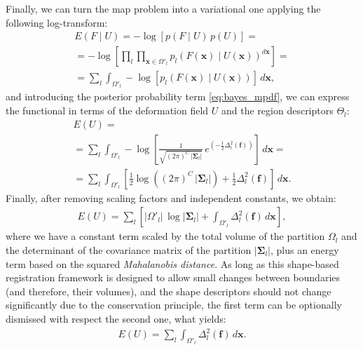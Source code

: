 Finally, we can turn the \gls{map} problem into a variational one
applying the following log-transform:
\begin{multline}
E(F \mid U)= -\log \left[ p(F \mid U) \, p(U) \right] = \\
= -\log \left[ \underset{l}{\prod} \underset{\mathbf{x}\in \Omega'_l}{\prod}
p_l( F(\mathbf{x}) \mid U(\mathbf{x}) )^{d\mathbf{x}} \right] = \\
= \sum\limits_l \int_{\Omega'_l} -\log \left[ p_l(F(\mathbf{x}) \mid U(\mathbf{x} ) ) \right] \, d\mathbf{x},
\label{eq:energy_1}
\end{multline}
and introducing the posterior probability term \eqref{eq:bayes_mpdf}, 
we can express the functional in terms of the deformation field $U$ and
the region descriptors $\Theta_l$:
\begin{multline}
E(U) = \\
= \sum\limits_l \int_{\Omega'_l} -\log \left[ \frac{1}{ \sqrt{(2\pi)^{C}\,\left|\boldsymbol{\Sigma}_{l}\right|}}\,{e^{\left(-\frac{1}{2}  \Delta^2_l (\mathbf{f}) \right)}} \right] \, d\mathbf{x} = \\
= \sum\limits_l \int_{\Omega'_l} \left[ \frac{1}{2} \log{ \left( (2\pi)^{C}\,\left|\boldsymbol{\Sigma}_{l}\right| \right)} + \frac{1}{2}  \Delta^2_l (\mathbf{f}) \right] \,d\mathbf{x}.
\end{multline}
Finally, after removing scaling factors and independent constants,
we obtain:
\begin{align}
E(U) = \sum\limits_l \left[ \left|\Omega'_l\right|\,\log \left|\mathbf{\Sigma}_l \right| + \int_{\Omega'_l} \Delta^2_l (\mathbf{f}) \,d\mathbf{x} \right],
\label{eq:map_energy}
\end{align}
where we have a constant term scaled by the total volume of the partition $\Omega_l$ and 
the determinant of the  covariance matrix of the partition $\left|\boldsymbol{\Sigma}_{l}\right|$,
plus an energy term based on the squared \emph{Mahalanobis distance}.
As long as this shape-based registration framework is designed to allow small changes
between boundaries (and therefore, their volumes), and the shape descriptors should not
change significantly due to the conservation principle, the first term can be optionally
dismissed with respect the second one, what yields:
\begin{align}
E(U) = \sum\limits_l \int_{\Omega'_l} \Delta^2_l (\mathbf{f}) \,d\mathbf{x}.
\label{eq:final_map_energy}
\end{align}

